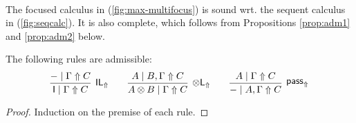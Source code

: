\documentclass[runningheads]{llncs}
\newcommand{\tl}{\otimes \mathsf{L}}
\newcommand{\tr}{\otimes \mathsf{R}}
\newcommand{\lleft}{{\multimap}\mathsf{L}}
\newcommand{\pass}{\mathsf{pass}}
\newcommand{\M}{\mathsf{M}}
\newcommand{\unitl}{\mathsf{IL}}
\newcommand{\unitr}{\mathsf{IR}}
\newcommand{\IR}{\unitr}
\newcommand{\ot}{\otimes}
\newcommand{\lolli}{\multimap}
\newcommand{\I}{\mathsf{I}}
\newcommand{\LI}{\mathsf{LI}}
\newcommand{\Pass}{\mathsf{P}}
\newcommand{\xvdash}{\vdash^{x}}
\newcommand{\niccolo}[1]{{\color{red}\textbf{Niccol{\`o}: }#1}}
\newcommand{\up}{\Uparrow}
\newcommand{\dn}{\Downarrow}
\newcommand{\sw}{\mathsf{sw}}
\newcommand{\blurLR}{\mathsf{blur_{M}}}
\begin{document}
\begin{equation}
\begin{array}{c}
  \end{array}
\end{equation}

The focused calculus in (\ref{fig:max-multifocus}) is sound wrt. the sequent calculus in (\ref{fig:seqcalc}). It
is also complete, which follows from Propositions \ref{prop:adm1}
and \ref{prop:adm2} below.
\begin{proposition}\label{prop:adm1}
  The following rules are admissible:
  \[
      \infer[\unitl_\up]{\I \mid \Gamma \up C}{- \mid \Gamma \up C}
    \qquad
    \infer[\tl_\up]{A \ot B \mid\Gamma \up C}{A \mid B , \Gamma \up C}
    \qquad
    \infer[\pass_\up]{- \mid A , \Gamma \up C }{
      A\mid \Gamma \up C
    }
    \]
\end{proposition}
\begin{proof}
  Induction on the premise of each rule.
\end{proof}
\end{document}
